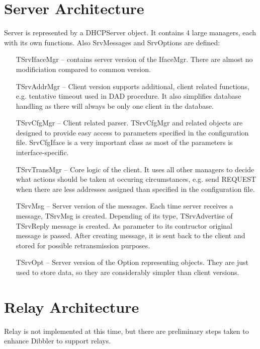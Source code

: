 \section{Server Architecture}

Server is represented by a DHCPServer object. It contains 4 large
managers, each with its own functions. Also SrvMessages and SrvOptions
are defined:
\begin{itemize}
\item[TSrvIfaceMgr] -- contains server version of the IfaceMgr. There
  are almost no modificiation compared to common version.

\item[TSrvAddrMgr] -- Client version supports additional, client
  related functions, e.g. tentative timeout used in DAD procedure. It
  also simplifies database handling as there will always be only one
  client in the database.
\item[TSrvCfgMgr] -- Client related parser. TSrvCfgMgr and related
  objects are designed to provide easy access to parameters specified
  in the configuration file. SrvCfgIface is a very important class as
  most of the parameters is interface-specific.
\item[TSrvTransMgr] -- Core logic of the client. It uses all other
  managers to decide what actions should be taken at occuring
  circumstances, e.g. send REQUEST when there are less addresses
  assigned than specified in the configuration file.
\item[TSrvMsg] -- Server version of the messages. Each time server
  receives a message, TSrvMsg is created. Depending of its type,
  TSrvAdvertise of TSrvReply message is created. As parameter to its
  contructor original message is passed. After creating message, it is
  sent back to the client and stored for possible retransmission
  purposes.
\item[TSrvOpt] -- Server version of the Option representing
  objects. They are just used to store data, so they are considerably
  simpler than client versions.
\end{itemize}

\section{Relay Architecture}
Relay is not implemented at this time, but there are preliminary steps
taken to enhance Dibbler to support relays.
